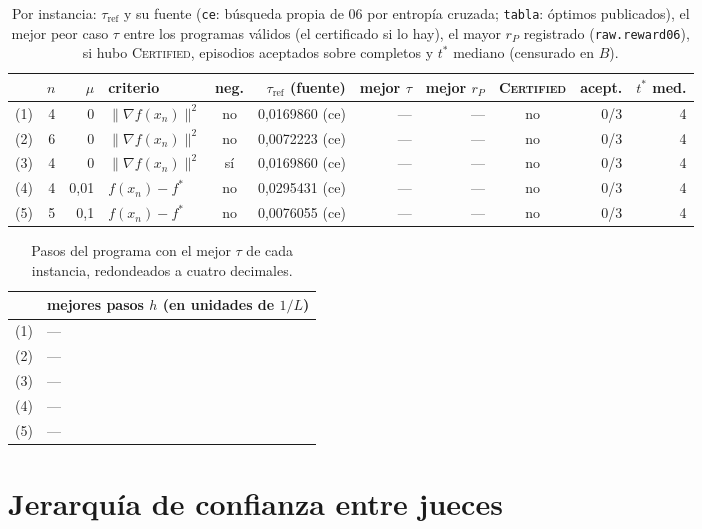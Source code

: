 \documentclass[11pt,a4paper]{article}
\begin{document}
\begin{table}[!ht]
\centering
\scriptsize
\begin{tabular}{@{}lrrlcrrrcrr@{}}
\toprule
& $n$ & $\mu$ & criterio & neg. & $\tau_{\mathrm{ref}}$ (fuente) & mejor $\tau$ & mejor $r_P$ & \textsc{Certified} & acept. & $t^*$ med. \\
\midrule
(1) & 4 & 0 & $\|\nabla f(x_n)\|^2$ & no & 0{,}0169860 (ce) & --- & --- & no & 0/3 & 4 \\
(2) & 6 & 0 & $\|\nabla f(x_n)\|^2$ & no & 0{,}0072223 (ce) & --- & --- & no & 0/3 & 4 \\
(3) & 4 & 0 & $\|\nabla f(x_n)\|^2$ & sí & 0{,}0169860 (ce) & --- & --- & no & 0/3 & 4 \\
(4) & 4 & 0{,}01 & $f(x_n) - f^*$ & no & 0{,}0295431 (ce) & --- & --- & no & 0/3 & 4 \\
(5) & 5 & 0{,}1 & $f(x_n) - f^*$ & no & 0{,}0076055 (ce) & --- & --- & no & 0/3 & 4 \\
\bottomrule
\end{tabular}
\caption{Por instancia: $\tau_{\mathrm{ref}}$ y su fuente (\texttt{ce}: búsqueda propia de 06 por entropía cruzada; \texttt{tabla}: óptimos publicados), el mejor peor caso $\tau$ entre los programas válidos (el certificado si lo hay), el mayor $r_P$ registrado (\texttt{raw.reward06}), si hubo \textsc{Certified}, episodios aceptados sobre completos y $t^*$ mediano (censurado en $B$).}
\label{tab:instancias}
\end{table}

\begin{table}[!ht]
\centering
\footnotesize
\begin{tabular}{@{}ll@{}}
\toprule
& mejores pasos $h$ (en unidades de $1/L$) \\
\midrule
(1) & --- \\
(2) & --- \\
(3) & --- \\
(4) & --- \\
(5) & --- \\
\bottomrule
\end{tabular}
\caption{Pasos del programa con el mejor $\tau$ de cada instancia, redondeados a cuatro decimales.}
\label{tab:pasos}
\end{table}

\section{Jerarquía de confianza entre jueces}
\end{document}
